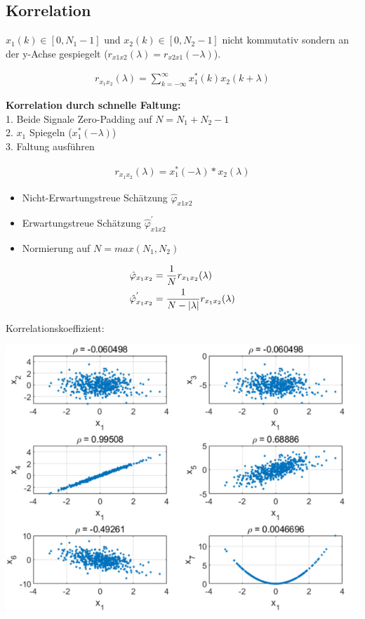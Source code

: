 \documentclass[10pt,a4paper]{article}
\begin{document}
  \subsection{Korrelation}
  $x_1(k) \in [0,N_1-1]$ und $x_2(k) \in [0,N_2-1]$ nicht kommutativ sondern an der y-Achse gespiegelt ($r_{x1x2}(\lambda)=r_{x2x1}(-\lambda)$).
  \begin{mdframed}[style=exercise]
    \begin{align}
        r_{x_1x_2}(\lambda) = \sum_{k=-\infty}^{\infty}x_1^*(k) x_2(k+\lambda)
    \end{align}
  \end{mdframed}
\textbf{Korrelation durch schnelle Faltung:}\\
1. Beide Signale Zero-Padding auf $N = N_1+N_2-1$\\
2. $x_1$ Spiegeln ($x_1^*(-\lambda)$)\\
3. Faltung ausführen
  \begin{mdframed}[style=exercise]
    \begin{align}
        r_{x_1x_2}(\lambda) = x_1^*(-\lambda)*x_2(\lambda)
    \end{align}
  \end{mdframed}
\begin{itemize}
    \item Nicht-Erwartungstreue Schätzung $\hat{\varphi}_{x1x2}$
    \item Erwartungstreue Schätzung $\hat{\varphi}_{x1x2}^{'}$
    \item Normierung auf $N = max(N_1,N_2)$
\end{itemize}
  \begin{mdframed}[style=exercise]
    \begin{align}
        \hat{\varphi}_{x_1x_2} &= \frac{1}{N} r_{x_1x_2}(\lambda)\\
        \hat{\varphi}_{x_1x_2}^{'} &= \frac{1}{N-\abs{\lambda}} r_{x_1x_2}(\lambda)
    \end{align}
  \end{mdframed}
Korrelationskoeffizient:
  \begin{center}
      \includegraphics[width=.35\textwidth]{./img/korkoeff.png}
  \end{center}
\end{document}

